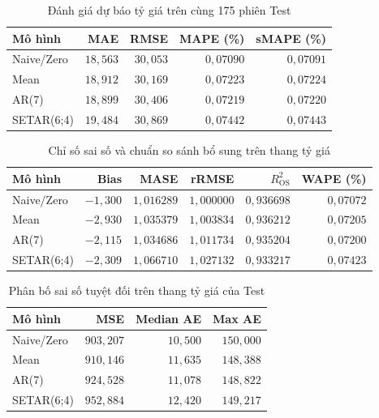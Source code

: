 \documentclass[a4paper,reqno,oneside]{book}
\numberwithin{equation}{chapter}
\begin{document}
\begin{table}[htbp]
\centering\small
\caption{Đánh giá dự báo tỷ giá trên cùng 175 phiên Test}
\label{tab:setar-price}
\begin{tabular}{lrrrr}
\toprule
Mô hình & MAE & RMSE & MAPE (\%) & sMAPE (\%) \\
\midrule
Naive/Zero & $18{,}563$ & $30{,}053$ & $0{,}07090$ & $0{,}07091$ \\
Mean & $18{,}912$ & $30{,}169$ & $0{,}07223$ & $0{,}07224$ \\
AR(7) & $18{,}899$ & $30{,}406$ & $0{,}07219$ & $0{,}07220$ \\
SETAR(6;4) & $19{,}484$ & $30{,}869$ & $0{,}07442$ & $0{,}07443$ \\
\bottomrule
\end{tabular}
\end{table}
\begin{table}[htbp]
\centering\small
\caption{Chỉ số sai số và chuẩn so sánh bổ sung trên thang tỷ giá}
\label{tab:setar-price-extra}
\begin{tabular}{lrrrrr}
\toprule
Mô hình & Bias & MASE & rRMSE & $R^2_{\mathrm{OS}}$ & WAPE (\%) \\
\midrule
Naive/Zero & $-1{,}300$ & $1{,}016289$ & $1{,}000000$ & $0{,}936698$ & $0{,}07072$ \\
Mean & $-2{,}930$ & $1{,}035379$ & $1{,}003834$ & $0{,}936212$ & $0{,}07205$ \\
AR(7) & $-2{,}115$ & $1{,}034686$ & $1{,}011734$ & $0{,}935204$ & $0{,}07200$ \\
SETAR(6;4) & $-2{,}309$ & $1{,}066710$ & $1{,}027132$ & $0{,}933217$ & $0{,}07423$ \\
\bottomrule
\end{tabular}
\end{table}
\begin{table}[htbp]
\centering\small
\caption{Phân bố sai số tuyệt đối trên thang tỷ giá của Test}
\label{tab:setar-price-tail}
\begin{tabular}{lrrr}
\toprule
Mô hình & MSE & Median AE & Max AE \\
\midrule
Naive/Zero & $903{,}207$ & $10{,}500$ & $150{,}000$ \\
Mean & $910{,}146$ & $11{,}635$ & $148{,}388$ \\
AR(7) & $924{,}528$ & $11{,}078$ & $148{,}822$ \\
SETAR(6;4) & $952{,}884$ & $12{,}420$ & $149{,}217$ \\
\bottomrule
\end{tabular}
\end{table}
\end{document}
